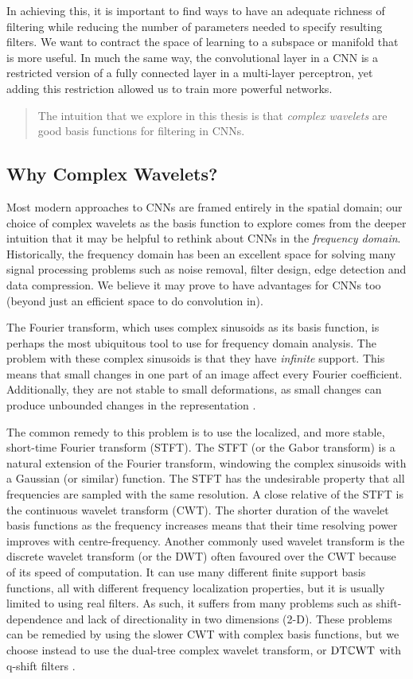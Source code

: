 In achieving this, it is important to find ways to have an adequate
richness of filtering while reducing the number of parameters needed to specify resulting
filters. We want to contract the space of learning to a subspace or manifold that
is more useful. In much the same way, the convolutional layer in a CNN is a restricted
version of a fully connected layer in a multi-layer perceptron, yet adding this
restriction allowed us to train more powerful networks.

\begin{quote}
The intuition that we explore in this thesis is that \emph{complex wavelets} are
good basis functions for filtering in CNNs.
\end{quote}

\subsection{Why Complex Wavelets?}
Most modern approaches to CNNs are framed entirely in the spatial domain; our
choice of complex wavelets as the basis function to explore comes from the
deeper intuition that it may be helpful to rethink about CNNs in the
\emph{frequency domain}.  Historically, the frequency domain has been an
excellent space for solving many signal processing problems such as noise
removal, filter design, edge detection and data compression. We believe it may prove to
have advantages for CNNs too (beyond just an efficient space to do convolution
in).

The Fourier transform, which uses complex sinusoids as
its basis function, is perhaps the most ubiquitous tool to use for frequency
domain analysis. The problem with these complex sinusoids is that they have
\emph{infinite} support. This means that small changes in one part of an image
affect every Fourier coefficient. Additionally, they are not stable to small
deformations, as small changes can produce unbounded changes in the representation
\cite{mallat_group_2012}.

The common remedy to this problem is to use the localized, and more
stable, short-time Fourier transform (STFT). The STFT (or the Gabor transform)
is a natural extension of the Fourier transform, windowing the complex sinusoids
with a Gaussian (or similar) function. The STFT has the undesirable property that all
frequencies are sampled with the same resolution. A close relative of the STFT is the
continuous wavelet transform (CWT). The shorter duration of the wavelet basis
functions as the frequency increases means that their time resolving power
improves with centre-frequency.
Another commonly used
wavelet transform is the discrete wavelet transform (or the DWT) often favoured over
the CWT because of its speed of computation. It can use many
different finite support basis functions, all with different frequency
localization properties, but it is usually limited to using real filters. As such, it
suffers from many problems such as shift-dependence and lack of directionality in
two dimensions (2-D). These problems can be remedied by using the slower CWT with complex basis
functions, but we choose instead to use the dual-tree complex wavelet transform,
or $\mathrm{DT}\mathbb{C}\mathrm{WT}$ \cite{selesnick_dual-tree_2005} with q-shift filters \cite{kingsbury_complex_2001}.

